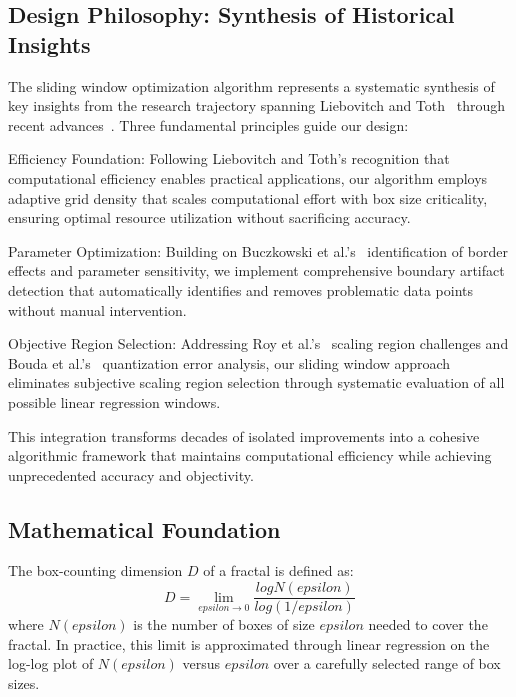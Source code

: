 \documentclass[preprint,12pt]{elsarticle}
\def\textbf#1{#1}%
\def\log{log}%
\def\epsilon{epsilon}%
\begin{document}
\subsection{Design Philosophy: Synthesis of Historical Insights}

The sliding window optimization algorithm represents a systematic synthesis of key insights from the research trajectory spanning Liebovitch and Toth~\cite{liebovitch1989} through recent advances~\cite{bouda2016,wu2020}. Three fundamental principles guide our design:

\textbf{Efficiency Foundation}: Following Liebovitch and Toth's recognition that computational efficiency enables practical applications, our algorithm employs adaptive grid density that scales computational effort with box size criticality, ensuring optimal resource utilization without sacrificing accuracy.

\textbf{Parameter Optimization}: Building on Buczkowski et al.'s~\cite{buczkowski1998} identification of border effects and parameter sensitivity, we implement comprehensive boundary artifact detection that automatically identifies and removes problematic data points without manual intervention.

\textbf{Objective Region Selection}: Addressing Roy et al.'s~\cite{roy2007} scaling region challenges and Bouda et al.'s~\cite{bouda2016} quantization error analysis, our sliding window approach eliminates subjective scaling region selection through systematic evaluation of all possible linear regression windows.

This integration transforms decades of isolated improvements into a cohesive algorithmic framework that maintains computational efficiency while achieving unprecedented accuracy and objectivity.

\subsection{Mathematical Foundation}

The box-counting dimension $D$ of a fractal is defined as:
\begin{equation}
D = \lim_{\epsilon \to 0} \frac{\log N(\epsilon)}{\log(1/\epsilon)}
\label{eq:box_counting_def}
\end{equation}
where $N(\epsilon)$ is the number of boxes of size $\epsilon$ needed to cover the fractal. In practice, this limit is approximated through linear regression on the log-log plot of $N(\epsilon)$ versus $\epsilon$ over a carefully selected range of box sizes.
\end{document}
